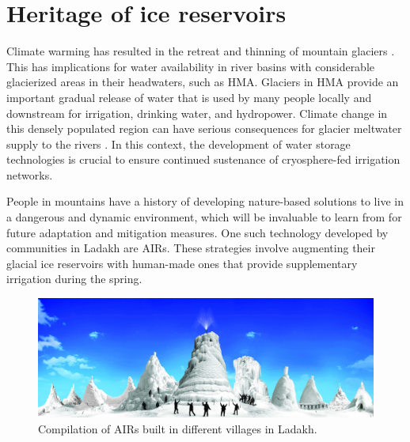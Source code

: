 \chapter{Heritage of ice reservoirs}


Climate warming has resulted in the retreat and thinning of mountain glaciers
\citep{ipccCrossChapterPaperMountains2022}. This has implications for water availability in river basins with considerable glacierized areas in their headwaters, such as \ac{HMA}. Glaciers in \ac{HMA} provide an important
gradual release of water that is used by many people locally and downstream for irrigation, drinking water, and
hydropower. Climate change in this densely populated region can have serious consequences for glacier meltwater
supply to the rivers \citep{immerzeelImportanceVulnerabilityWorld2020}. In this context, the development of
water storage technologies is crucial to ensure continued sustenance of cryosphere-fed irrigation networks.

People in mountains have a history of developing nature-based solutions to live in a dangerous and dynamic
environment, which will be invaluable to learn from for future adaptation and mitigation measures. One such
technology developed by communities in Ladakh are \ac{AIRs}. These strategies involve augmenting their glacial
ice reservoirs with human-made ones that provide supplementary irrigation during the spring.

\begin{figure}[htb]
	\includegraphics[width=\textwidth]{figs/AIRs_Ladakh}
	\caption{Compilation of \ac{AIRs} built in different villages in Ladakh.}
	\label{fig:airs_ladakh}
\end{figure}

